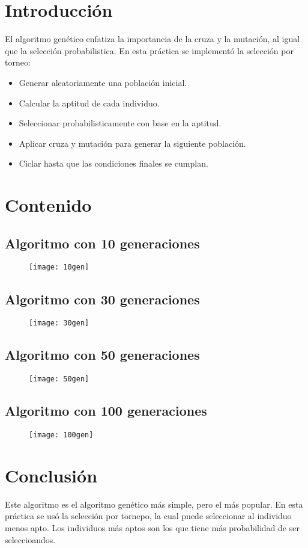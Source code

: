 \documentclass{article}
\begin{document}
\maketitle
\tableofcontents
\section{Introducción}
El algoritmo genético enfatiza la importancia de la cruza y la mutación, al igual que la selección probabilistica.
En esta práctica se implementó la selección por torneo:
\begin{itemize}
	\item Generar aleatoriamente una población inicial.
	\item Calcular la aptitud de cada individuo.
	\item Seleccionar probabilisticamente con base en la aptitud.
	\item Aplicar cruza y mutación para generar la siguiente población.
	\item Ciclar hasta que las condiciones finales se cumplan.
\end{itemize}
\newpage
\section{Contenido}
\subsection{Algoritmo con 10 generaciones}
\begin{figure}[h!]
	\centering
	\texttt{[image: 10gen]}
\end{figure}
\newpage
\subsection{Algoritmo con 30 generaciones}
\begin{figure}[h!]
	\centering
	\texttt{[image: 30gen]}
\end{figure}
\newpage
\subsection{Algoritmo con 50 generaciones}
\begin{figure}[h!]
	\centering
	\texttt{[image: 50gen]}
\end{figure}
\newpage
\subsection{Algoritmo con 100 generaciones}
\begin{figure}[h!]
	\centering
	\texttt{[image: 100gen]}
\end{figure}
\section{Conclusión}
Este algoritmo es el algoritmo genético más simple, pero el más popular. En esta práctica se usó la selección por tornepo, la cual puede seleccionar al individuo menos apto. Los individuos más aptos son los que tiene más probabilidad de ser seleccioandos.
\end{document}
